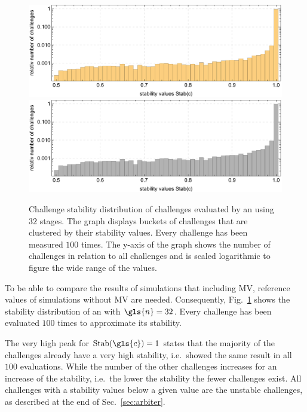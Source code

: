 \vspace{0.25cm}
\begin{figure}[!ht]
\ifx{}\undefined
{}
\else
	\if{}
	\centering
	\includegraphics[width=1.00\textwidth]{images/arbiter-stability-distribution-simulation.pdf}
	\else
	\includegraphics[width=1.00\textwidth]{images/arbiter-stability-distribution-simulation_mono.pdf}
	\fi
\fi
\caption[Challenge stability distribution of an \apuf]{Challenge stability distribution of challenges evaluated by an \apuf using $32$ stages. 
The graph displays buckets of challenges that are clustered by their stability values.
Every challenge has been measured $100$ times. The y-axis of the graph shows the number of challenges in relation to all challenges and is scaled logarithmic to figure the wide range of the values.}  %
\label{fig:arbiterstabilitydistribution}
\end{figure}
\pagebreak

To be able to compare the results of simulations that including \ac{MV}, reference values of \apufs simulations without \ac{MV} are needed.
Consequently, Fig.\ \ref{fig:arbiterstabilitydistribution} shows the stability distribution of an \apuf with $\gls{n} = 32$.
Every challenge has been evaluated $100$ times to approximate its stability.

The very high peak for $\Stab(\gls{c}) = 1$ states that the majority of the challenges already have a very high stability, i.e.\ showed the same result in all $100$ evaluations.
While the number of the other challenges increases for an increase of the stability, i.e.\ the lower the stability the fewer challenges exist.
All challenges with a stability values below a given value are the unstable challenges, as described at the end of Sec.\ \ref{sec:arbiter}.

